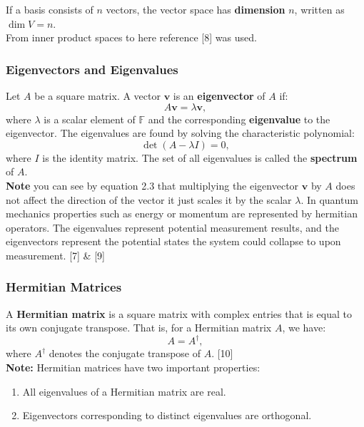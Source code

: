 \noindent If a basis consists of \( n \) vectors, the vector space has \textbf{dimension} \( n \), written as \( \dim V = n \).  \\
\noindent From inner product spaces to here reference [8] was used. 

\subsubsection{Eigenvectors and Eigenvalues}
Let \( A \) be a square matrix. A vector \( \mathbf{v} \) is an \textbf{eigenvector} of \( A \) if:
\begin{equation}
    A\mathbf{v} = \lambda \mathbf{v},
\end{equation}
\noindent where \( \lambda  \) is a scalar element of \( \mathbb{F} \) and the corresponding \textbf{eigenvalue} to the eigenvector. The eigenvalues are found by solving the characteristic polynomial:
\begin{equation}
    \det(A - \lambda I) = 0,
\end{equation}
where \( I \) is the identity matrix. The set of all eigenvalues is called the \textbf{spectrum} of \( A \).\\

\noindent \textbf{Note} you can see by equation 2.3 that multiplying the eigenvector \( \mathbf{v} \) by \( A \) does not affect the direction of the vector it just scales it by the scalar \( \lambda  \). In quantum mechanics properties such as energy or momentum are represented by hermitian operators. The eigenvalues represent potential measurement results, and the eigenvectors represent the potential states the system could collapse to upon measurement. [7] \& [9]


\subsubsection{Hermitian Matrices}

A \textbf{Hermitian matrix} is a square matrix with complex entries that is equal to its own conjugate transpose. That is, for a Hermitian matrix \( A \), we have:
\begin{equation}
A = A^\dagger,
\end{equation}
where \( A^\dagger \) denotes the conjugate transpose of \( A \). [10]
\\

\noindent \textbf{Note:} Hermitian matrices have two important properties:
\begin{enumerate}
    \item All eigenvalues of a Hermitian matrix are real.
    \item Eigenvectors corresponding to distinct eigenvalues are orthogonal.
\end{enumerate}

